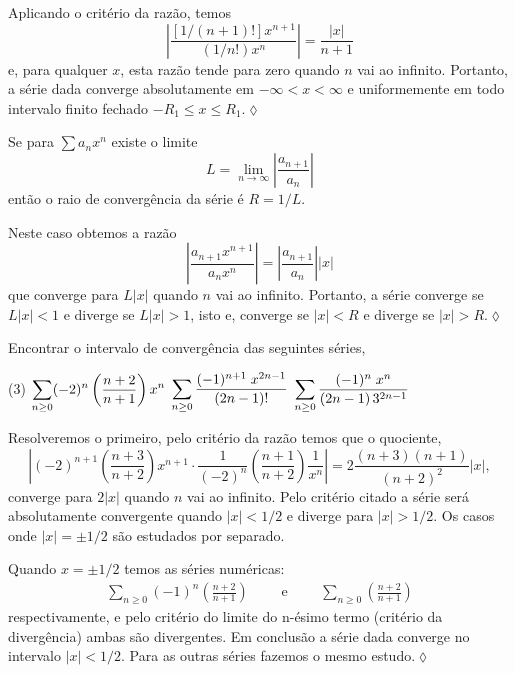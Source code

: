 \solo Aplicando o critério da razão, temos
\[
\left|\frac{[1/(n+1)!]x^{n+1}}{(1/n!)x^{n}}\right|=\frac{|x|}{n+1}
\]
e, para qualquer $x$, esta razão tende para zero quando $n$ vai ao
infinito. Portanto, a série dada converge absolutamente em
$-\infty < x < \infty$ e uniformemente em todo intervalo finito fechado
$-R_1\leq x \leq R_1$.\hfill \(\lozenge\)

\begin{exer}
Se para $\sum a_nx^n$ existe o limite
\begin{equation*}
  L = \lim_{n\to\infty}\left|\frac{a_{n+1}}{a_n}\right|
\end{equation*}
então o raio de convergência da série é $R = 1/L$.
\end{exer}

\solo Neste caso obtemos a razão
 \begin{equation*}
  \left| \frac{a_{n+1}x^{n+1}}{a_nx^n} \right|=\left| \frac{a_{n+1}}{a_n}\right||x|
 \end{equation*}
que converge para $L|x|$ quando $n$ vai ao infinito. Portanto, a
série converge se $L|x| <1$  e diverge se $L|x|>1$, isto e, converge se $|x| <R$ e 
diverge se $|x|>R$.\hfill \(\lozenge\)

\begin{exer}
Encontrar o intervalo de convergência das seguintes séries,
\begin{tasks}[label=(\alph*),label-width=4ex,ref=(\alph*)](3)
\task \(\displaystyle \sum_{n\geq 0}(-2)^n\left(\frac{n+2}{n+1}\right)x^n\)
\task \(\displaystyle \sum_{n\geq 0}\frac{(-1)^{n+1}\;x^{2n-1}}{(2n-1)!}\)
\task \(\displaystyle \sum_{n\geq 0}\frac{(-1)^{n}\;x^n}{(2n-1)\,3^{2n-1}}\)
\end{tasks}
\end{exer}

\solo Resolveremos o primeiro, pelo critério da razão temos que o
quociente,
\begin{equation*}
    \left|(-2)^{n+1}\left(\frac{n+3}{n+2}\right)x^{n+1}\cdot\frac{1}{(-2)^n}
    \left(\frac{n+1}{n+2}\right)\frac{1}{x^n}
    \right|=2\frac{(n+3)(n+1)}{(n+2)^2}|x|,
\end{equation*}
converge para $2|x|$ quando $n$ vai ao infinito. Pelo critério
citado a série será absolutamente convergente quando $|x|<1/2$ e
diverge para $|x|>1/2$. Os casos onde $|x|=\pm 1/2$ são estudados
por separado.

Quando $x=\pm 1/2$ temos as séries numéricas:
\begin{align*}
    \sum_{n\ge 0}(-1)^n\left(\frac{n+2}{n+1}\right)\qquad \text{ e
    }\qquad \sum_{n\ge 0}\left(\frac{n+2}{n+1}\right)
\end{align*}
respectivamente, e pelo critério do limite do n-ésimo termo (critério da divergência) ambas são divergentes. Em conclusão a
série dada converge no intervalo $|x|<1/2$. Para as outras séries fazemos o mesmo estudo.\hfill \(\lozenge\)


